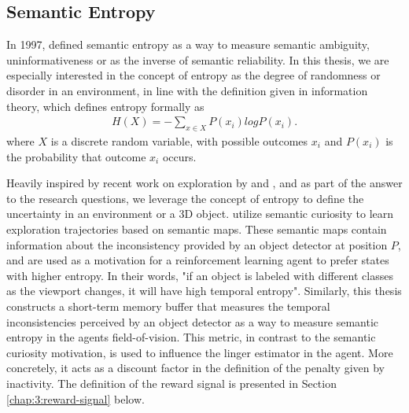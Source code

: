 \subsection{Semantic Entropy}\label{chap:3:semantic-entropy}
In 1997, \textcite{melamed1997measuring} defined semantic entropy as a way to measure semantic ambiguity, uninformativeness or as the inverse of semantic reliability. In this thesis, we are especially interested in the concept of entropy as the degree of randomness or disorder in an environment, in line with the definition given in information theory, which defines entropy formally as
\begin{gather}
    H(X) = - \sum_{x\in X} P(x_i) log P(x_i). \label{eu_semantic_entropy}
\end{gather}
where $X$ is a discrete random variable, with possible outcomes $x_i$ and $P(x_i)$ is the probability that outcome $x_i$ occurs.

Heavily inspired by recent work on exploration by \textcite{chen2019learning} and  \textcite{chaplot2020semantic}, and as part of the answer to the research questions, we leverage the concept of entropy to define the uncertainty in an environment or a 3D object. \textcite{chaplot2020semantic} utilize semantic curiosity to learn exploration trajectories based on semantic maps. These semantic maps contain information about the inconsistency provided by an object detector at position $P$, and are used as a motivation for a reinforcement learning agent to prefer states with higher entropy. In their words, "if an object is labeled with different classes as the viewport changes, it will have high temporal entropy". Similarly, this thesis constructs a short-term memory buffer that measures the temporal inconsistencies perceived by an object detector as a way to measure semantic entropy in the agents field-of-vision. This metric, in contrast to the semantic curiosity motivation, is used to influence the linger estimator in the agent. More concretely, it acts as a discount factor in the definition of the penalty given by inactivity. The definition of the reward signal is presented in Section \ref{chap:3:reward-signal} below.









